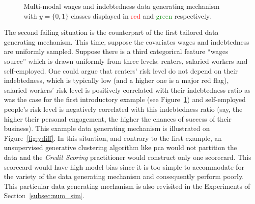 \begin{figure}
\centering
{}
\caption{\label{fig:xdiff} Multi-modal wages and indebtedness data generating mechanism with $y = \{0,1\}$ classes displayed in \textcolor{red}{red} and \textcolor{green}{green} respectively.}
\end{figure}

The second failing situation is the counterpart of the first tailored data generating mechanism. This time, suppose the covariates wages and indebtedness are uniformly sampled. Suppose there is a third categorical feature ``wages source'' which is drawn uniformly from three levels: renters, salaried workers and self-employed. One could argue that renters' risk level do not depend on their indebtedness, which is typically low (and a higher one is a major red flag), salaried workers' risk level is positively correlated with their indebtedness ratio as was the case for the first introductory example (see Figure~\ref{fig:xdiff}) and self-employed people's risk level is negatively correlated with this indebtedness ratio (say, the higher their personal engagement, the higher the chances of success of their business). This example data generating mechanism is illustrated on Figure~\ref{fig:ydiff}. In this situation, and contrary to the first example, an unsupervised generative clustering algorithm like \gls{pca} would not partition the data and the \textit{Credit Scoring} practitioner would construct only one scorecard. This scorecard would have high model bias since it is too simple to accommodate for the variety of the data generating mechanism and consequently perform poorly. This particular data generating mechanism is also revisited in the Experiments of Section~\ref{subsec:num_sim}.


